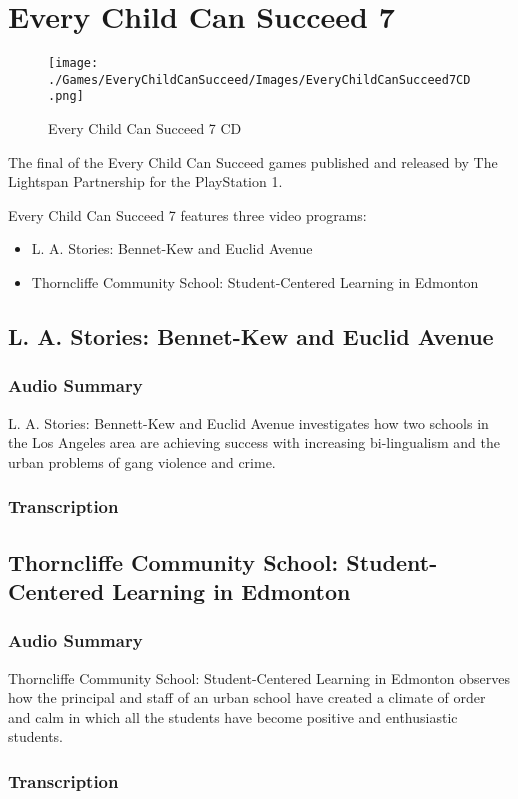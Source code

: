 \chapter{Every Child Can Succeed 7}

\begin{figure}[H]
    \centering
    \texttt{[image: ./Games/EveryChildCanSucceed/Images/EveryChildCanSucceed7CD.png]}
    \caption{Every Child Can Succeed 7 CD}
\end{figure}

The final of the Every Child Can Succeed games published and released by The Lightspan Partnership for the PlayStation 1.

Every Child Can Succeed 7 features three video programs:

\begin{itemize}
    \item L. A. Stories: Bennet-Kew and Euclid Avenue
    \item Thorncliffe Community School: Student-Centered Learning in Edmonton
\end{itemize}

\clearpage
\newpage

\section{L. A. Stories: Bennet-Kew and Euclid Avenue}

\subsection{Audio Summary}

L. A. Stories: Bennett-Kew and Euclid Avenue investigates how two schools in the Los Angeles area are achieving success with increasing bi-lingualism and the urban problems of gang violence and crime.

\subsection{Transcription}

\section{Thorncliffe Community School: Student-Centered Learning in Edmonton}

\subsection{Audio Summary}

Thorncliffe Community School: Student-Centered Learning in Edmonton observes how the principal and staff of an urban school have created a climate of order and calm in which all the students have become positive and enthusiastic students.

\subsection{Transcription}
